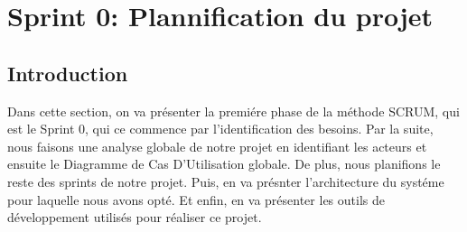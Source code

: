 \chapter{Sprint 0: Plannification du projet}
\localtableofcontents
\section{Introduction}
\noindent
Dans cette section, on va présenter la premiére phase de la méthode SCRUM, qui est le Sprint 0, qui ce commence par l'identification des besoins. Par la suite, nous faisons une analyse globale de notre projet en identifiant les acteurs et ensuite le Diagramme de Cas D'Utilisation globale. De plus, nous planifions le reste des sprints de notre projet. Puis, en va présnter l'architecture du systéme pour laquelle nous avons opté. Et enfin, en va présenter les outils de développement utilisés pour réaliser ce projet.






